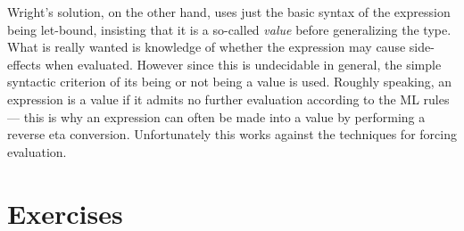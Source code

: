 Wright's solution, on the other hand, uses just the basic syntax of the
expression being let-bound, insisting that it is a so-called {\em value} before
generalizing the type. What is really wanted is knowledge of whether the
expression may cause side-effects when evaluated. However since this is
undecidable in general, the simple syntactic criterion of its being or not
being a value is used. Roughly speaking, an expression is a value if it admits
no further evaluation according to the ML rules --- this is why an expression
can often be made into a value by performing a reverse eta conversion.
Unfortunately this works against the techniques for forcing evaluation.

\section*{Exercises}

